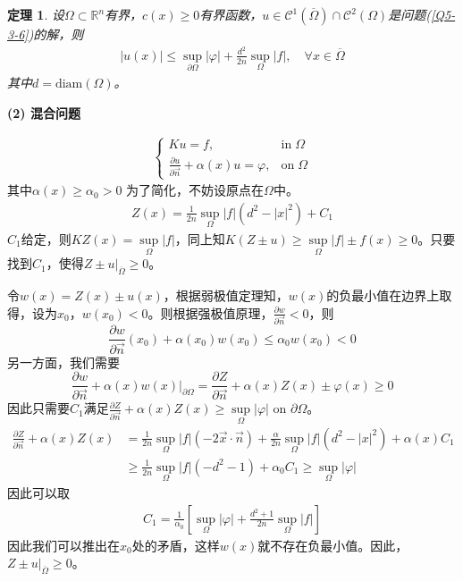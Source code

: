 \documentclass[11pt, a4paper]{article}
\theoremstyle{theorem}
\newtheorem{thm}{定理}[section]
\begin{document}
\begin{thm}
设$\Omega \subset \mathbb{R}^n$有界，$c(x) \geq 0$有界函数，$u \in \mathcal{C}^1(\overline{\Omega}) \cap \mathcal{C}^2(\Omega)$是问题(\ref{Q5-3-6})的解，则
\begin{align}
    |u(x)| \leq \sup\limits_{\partial \Omega} |\varphi| + \frac{d^2}{2 n} \sup\limits_{\Omega} |f|, \quad \forall x \in \overline{\Omega}
\end{align}
其中$d = \text{diam}(\Omega)$。
\end{thm}

\textbf{(2) 混合问题}

\begin{align}
    \label{Q5-3-7}
    \begin{cases}
      K u = f, \; &\text{in} \; \Omega \\
      \frac{\partial u}{\partial \vec{n}} + \alpha(x) u = \varphi, &\text{on} \; \Omega
    \end{cases}
\end{align}
其中$\alpha(x) \geq \alpha_0 > 0$
为了简化，不妨设原点在$\Omega$中。
\begin{align}
    Z(x) =  \frac{1}{2n} \sup\limits_{\Omega} |f| (d^2 - |x|^2) + C_1
\end{align}
$C_1$给定，则$K Z(x) = \sup\limits_{\Omega} |f|$，同上知$K (Z \pm u) \geq \sup\limits_{\Omega} |f| \pm f(x) \geq 0$。只要找到$C_1$，使得$Z \pm u \bigg|_{\overline{\Omega}} \geq 0$。

令$w(x) = Z(x) \pm u(x)$，根据弱极值定理知，$w(x)$的负最小值在边界上取得，设为$x_0$，$w(x_0) < 0$。则根据强极值原理，$\frac{\partial w}{\partial \vec{n}} <0$，则
$$
\frac{\partial w}{\partial \vec{n}}(x_0) + \alpha(x_0) w(x_0) \leq \alpha_0 w(x_0) < 0
$$
另一方面，我们需要
$$
\frac{\partial w}{\partial \vec{n}} + \alpha(x) w(x) \bigg|_{\partial \Omega} = \frac{\partial Z}{\partial \vec{n}} + \alpha(x) Z(x) \pm \varphi(x) \geq 0
$$
因此只需要$C_1$满足$\frac{\partial Z}{\partial \vec{n}} + \alpha(x) Z(x) \geq \sup\limits_{\Omega} |\varphi|$ on $\partial \Omega$。
\begin{align*}
    \frac{\partial Z}{\partial \vec{n}} + \alpha(x) Z(x)
    &= \frac{1}{2n} \sup\limits_{\Omega} |f| (-2 \vec{x} \cdot \vec{n}) + \frac{\alpha}{2n} \sup\limits_{\Omega} |f| (d^2 - |x|^2) + \alpha(x) C_1 \\
    &\geq \frac{1}{2n} \sup\limits_{\Omega} |f| (- d^2 - 1) + \alpha_0 C_1 \geq \sup\limits_{\Omega} |\varphi|
\end{align*}
因此可以取
\begin{align}
    C_1 = \frac{1}{\alpha_0} \left[\sup\limits_{\Omega} |\varphi| + \frac{d^2 + 1}{2n} \sup\limits_{\Omega} |f| \right]
\end{align}
因此我们可以推出在$x_0$处的矛盾，这样$w(x)$就不存在负最小值。因此，$Z \pm u \bigg|_{\overline{\Omega}} \geq 0$。
\end{document}
